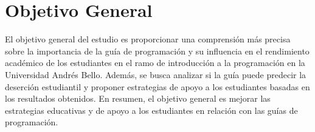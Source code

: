 \hypertarget{objetivo_general}{%
    \section{Objetivo General}\label{Objetivo General}}
    \vfill
    El objetivo general del estudio es proporcionar una comprensión más 
    precisa sobre la importancia de la guía de programación y su influencia 
    en el rendimiento académico de los estudiantes en el ramo de introducción 
    a la programación en la Universidad Andrés Bello. Además, se busca 
    analizar si la guía puede predecir la deserción estudiantil y proponer 
    estrategias de apoyo a los estudiantes basadas en los resultados obtenidos. 
    En resumen, el objetivo general es mejorar las estrategias educativas y de
    apoyo a los estudiantes en relación con las guías de programación.
    \vfill
